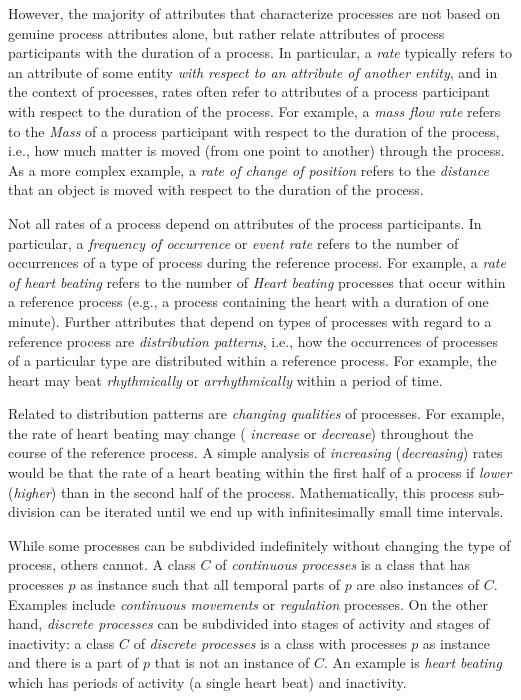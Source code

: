 \documentclass{bioinfo}
\begin{document}
However, the majority of attributes that characterize processes are
not based on genuine process attributes alone, but rather relate
attributes of process participants with the duration of a process. In
particular, a {\em rate} typically refers to an attribute of some
entity {\em with respect to an attribute of another entity}, and in
the context of processes, rates often refer to attributes of a process
participant with respect to the duration of the process. For example,
a {\em mass flow rate} refers to the {\em Mass} of a process
participant with respect to the duration of the process, i.e., how
much matter is moved (from one point to another) through the process.
As a more complex example, a {\em rate of change of position} refers
to the {\em distance} that an object is moved with respect to the
duration of the process.

Not all rates of a process depend on attributes of the process
participants. In particular, a {\em frequency of occurrence} or {\em
  event rate} refers to the number of occurrences of a type of process
during the reference process. For example, a {\em rate of heart
  beating} refers to the number of {\em Heart beating} processes that
occur within a reference process (e.g., a process containing the heart
with a duration of one minute). Further attributes that depend on
types of processes with regard to a reference process are {\em
  distribution patterns}, i.e., how the occurrences of processes of a
particular type are distributed within a reference process. For
example, the heart may beat {\em rhythmically} or {\em arrhythmically}
within a period of time.

Related to distribution patterns are {\em changing qualities} of
processes. For example, the rate of heart beating may change ({\em
  increase} or {\em decrease}) throughout the course of the reference
process. A simple analysis of {\em increasing} ({\em decreasing})
rates would be that the rate of a heart beating within the first half
of a process if {\em lower} ({\em higher}) than in the second half of
the process. Mathematically, this process sub-division can be iterated
until we end up with infinitesimally small time intervals.

While some processes can be subdivided indefinitely without changing
the type of process, others cannot. A class $C$ of {\em continuous
  processes} is a class that has processes $p$ as instance such that
all temporal parts of $p$ are also instances of $C$. Examples include
{\em continuous movements} or {\em regulation} processes. On the other
hand, {\em discrete processes} can be subdivided into stages of
activity and stages of inactivity: a class $C$ of {\em discrete
  processes} is a class with processes $p$ as instance and there is a
part of $p$ that is not an instance of $C$. An example is {\em heart
  beating} which has periods of activity (a single heart beat) and
inactivity.
\end{document}
